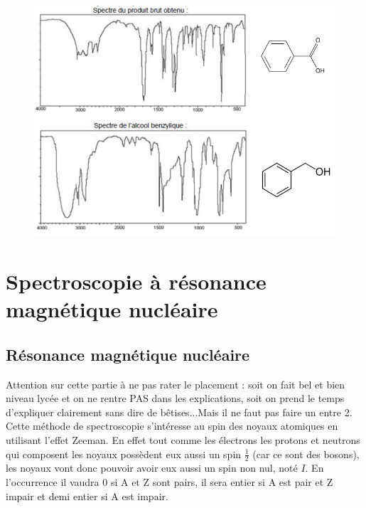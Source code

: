 \documentclass[12pt,prb,aps,epsf]{report}
\begin{document}
\begin{figure}[h!]
	\centerline{\includegraphics[width=16cm]{spectresIR}}
\end{figure}

\pagebreak


\newpage
\section{Spectroscopie à résonance magnétique nucléaire}
\subsection{Résonance magnétique nucléaire}
Attention sur cette partie à ne pas rater le placement : soit on fait bel et bien niveau lycée et on ne rentre PAS dans les explications, soit on prend le temps d'expliquer clairement sans dire de bêtises...Mais il ne faut pas faire un entre 2. \\

Cette méthode de spectroscopie s'intéresse au spin des noyaux atomiques en utilisant l'effet Zeeman. En effet tout comme les électrons les protons et neutrons qui composent les noyaux possèdent eux aussi un spin $\frac{1}{2}$ (car ce sont des bosons), les noyaux vont donc pouvoir avoir eux aussi un spin non nul, noté $I$. En l'occurrence il vaudra 0 si A et Z sont pairs, il sera entier si A est pair et Z impair et demi entier si A est impair. 
\end{document}
